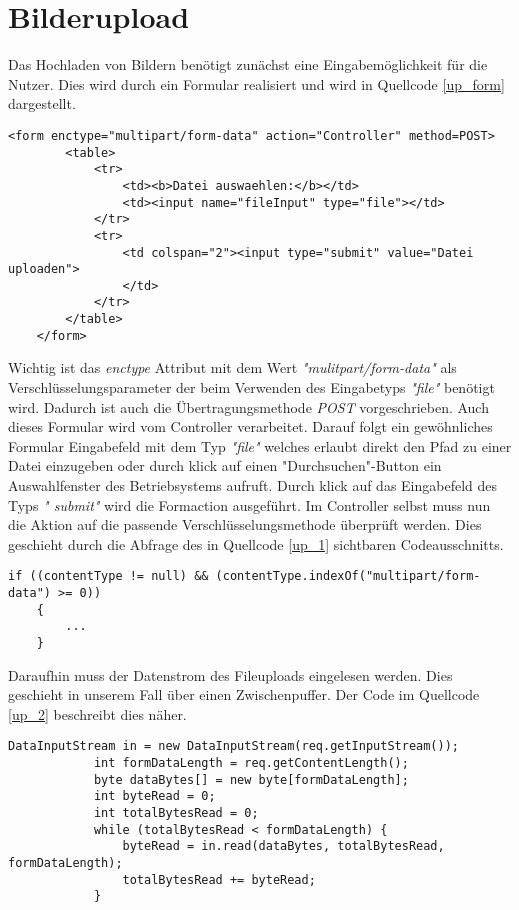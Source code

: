 \chapter{Bilderupload}
Das Hochladen von Bildern benötigt zunächst eine Eingabemöglichkeit für die Nutzer. Dies wird durch ein Formular realisiert und wird in Quellcode \ref{up_form} dargestellt.
\begin{lstlisting}[caption={Formular zum Hochladen von Bildern},label=up_form]
	<form enctype="multipart/form-data" action="Controller" method=POST>
		<table>
			<tr>
				<td><b>Datei auswaehlen:</b></td>
				<td><input name="fileInput" type="file"></td>
			</tr>
			<tr>
				<td colspan="2"><input type="submit" value="Datei uploaden">
				</td>
			</tr>
		</table>
	</form>
\end{lstlisting}
Wichtig ist das \textit{enctype} Attribut mit dem Wert \textit{"mulitpart/form-data"} als Verschlüsselungsparameter der beim Verwenden des Eingabetyps \textit{"file"} benötigt wird. Dadurch ist auch die Übertragungsmethode \textit{POST} vorgeschrieben. Auch dieses Formular wird vom Controller verarbeitet.
Darauf folgt ein gewöhnliches Formular Eingabefeld mit dem Typ \textit{"file"} welches erlaubt direkt den Pfad zu einer Datei einzugeben oder durch klick auf einen "Durchsuchen"-Button ein Auswahlfenster des Betriebsystems aufruft. Durch klick auf das Eingabefeld des Typs \textit{" submit"} wird die Formaction ausgeführt.
Im Controller selbst muss nun die Aktion auf die passende Verschlüsselungsmethode überprüft werden. Dies geschieht durch die Abfrage des in Quellcode \ref{up_1} sichtbaren Codeausschnitts.
\begin{lstlisting}[caption={Abfrage auf Verschlüsselungsmethode},label=up_1]
    if ((contentType != null) && (contentType.indexOf("multipart/form-data") >= 0))
    {
        ...
    }
\end{lstlisting}
Daraufhin muss der Datenstrom des Fileuploads eingelesen werden. Dies geschieht in unserem Fall über einen Zwischenpuffer. Der Code im Quellcode \ref{up_2} beschreibt dies näher.
\begin{lstlisting}[caption={Zwischenspeichern des Datenstroms in einen Puffer},label=up_2]
			DataInputStream in = new DataInputStream(req.getInputStream());
			int formDataLength = req.getContentLength();
			byte dataBytes[] = new byte[formDataLength];
			int byteRead = 0;
			int totalBytesRead = 0;
			while (totalBytesRead < formDataLength) {
				byteRead = in.read(dataBytes, totalBytesRead, formDataLength);
				totalBytesRead += byteRead;
			}
\end{lstlisting}

